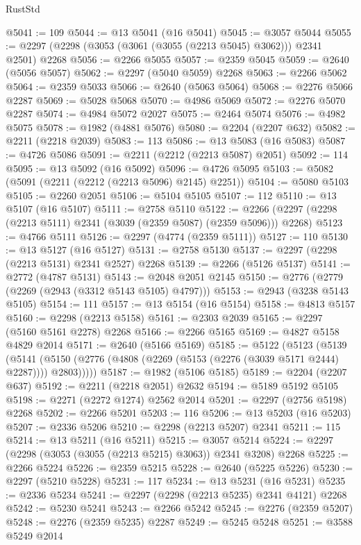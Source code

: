 \begin{lexlean}{RustStd}
\begin{coremodule}
{\begin{coremodule}
{{{{{{{{{{{{{{{{{{{{{{{{{{{{{{{{{{{{{{{{{{{{{{{{{{{{{{@5041 := 109
@5044 := @13 @5041 (@16 @5041)
@5045 := @3057 @5044
@5055 := @2297 (@2298 (@3053 (@3061 (@3055 (@2213 @5045) @3062))) @2341 @2501) @2268
@5056 := @2266 @5055
@5057 := @2359 @5045
@5059 := @2640 (@5056 @5057)
@5062 := @2297 (@5040 @5059) @2268
@5063 := @2266 @5062
@5064 := @2359 @5033
@5066 := @2640 (@5063 @5064)
@5068 := @2276 @5066 @2287
@5069 := @5028 @5068
@5070 := @4986 @5069
@5072 := @2276 @5070 @2287
@5074 := @4984 @5072 @2027
@5075 := @2464 @5074
@5076 := @4982 @5075
@5078 := @1982 (@4881 @5076)
@5080 := @2204 (@2207 @632)
@5082 := @2211 (@2218 @2039)
@5083 := 113
@5086 := @13 @5083 (@16 @5083)
@5087 := @4726 @5086
@5091 := @2211 (@2212 (@2213 @5087) @2051)
@5092 := 114
@5095 := @13 @5092 (@16 @5092)
@5096 := @4726 @5095
@5103 := @5082 (@5091 (@2211 (@2212 (@2213 @5096) @2145) @2251))
@5104 := @5080 @5103
@5105 := @2260 @2051
@5106 := @5104 @5105
@5107 := 112
@5110 := @13 @5107 (@16 @5107)
@5111 := @2758 @5110
@5122 := @2266 (@2297 (@2298 (@2213 @5111) @2341 (@3039 (@2359 @5087) (@2359 @5096))) @2268)
@5123 := @4766 @5111
@5126 := @2297 (@4774 (@2359 @5111))
@5127 := 110
@5130 := @13 @5127 (@16 @5127)
@5131 := @2758 @5130
@5137 := @2297 (@2298 (@2213 @5131) @2341 @2527) @2268
@5139 := @2266 (@5126 @5137)
@5141 := @2772 (@4787 @5131)
@5143 := @2048 @2051 @2145
@5150 := @2776 (@2779 (@2269 (@2943 (@3312 @5143 @5105) @4797)))
@5153 := @2943 (@3238 @5143 @5105)
@5154 := 111
@5157 := @13 @5154 (@16 @5154)
@5158 := @4813 @5157
@5160 := @2298 (@2213 @5158)
@5161 := @2303 @2039
@5165 := @2297 (@5160 @5161 @2278) @2268
@5166 := @2266 @5165
@5169 := @4827 @5158 @4829 @2014
@5171 := @2640 (@5166 @5169)
@5185 := @5122
    (@5123
      (@5139
        (@5141 (@5150 (@2776 (@4808 (@2269 (@5153 (@2276 (@3039 @5171 @2444) @2287)))) @2803)))))
@5187 := @1982 (@5106 @5185)
@5189 := @2204 (@2207 @637)
@5192 := @2211 (@2218 @2051) @2632
@5194 := @5189 @5192 @5105
@5198 := @2271 (@2272 @1274) @2562 @2014
@5201 := @2297 (@2756 @5198) @2268
@5202 := @2266 @5201
@5203 := 116
@5206 := @13 @5203 (@16 @5203)
@5207 := @2336 @5206
@5210 := @2298 (@2213 @5207) @2341
@5211 := 115
@5214 := @13 @5211 (@16 @5211)
@5215 := @3057 @5214
@5224 := @2297 (@2298 (@3053 (@3055 (@2213 @5215) @3063)) @2341 @3208) @2268
@5225 := @2266 @5224
@5226 := @2359 @5215
@5228 := @2640 (@5225 @5226)
@5230 := @2297 (@5210 @5228)
@5231 := 117
@5234 := @13 @5231 (@16 @5231)
@5235 := @2336 @5234
@5241 := @2297 (@2298 (@2213 @5235) @2341 @4121) @2268
@5242 := @5230 @5241
@5243 := @2266 @5242
@5245 := @2276 (@2359 @5207)
@5248 := @2276 (@2359 @5235) @2287
@5249 := @5245 @5248
@5251 := @3588 @5249 @2014
}}}}}}}}}}}}}}}}}}}}}}}}}}}}}}}}}}}}}}}}}}}}}}}}}}}}}}
\end{coremodule}}
\end{coremodule}
\end{lexlean}
